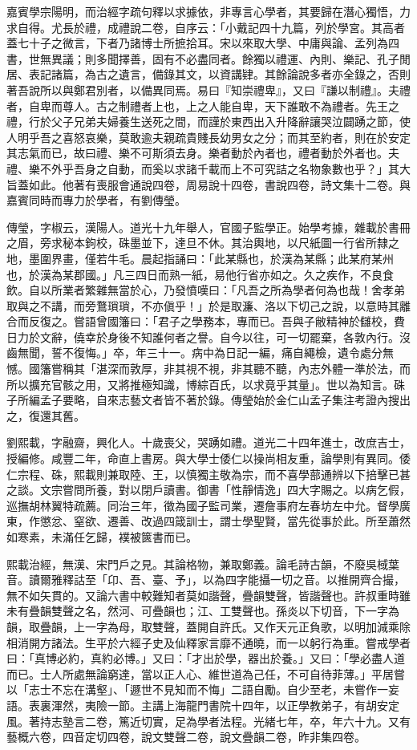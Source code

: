 \begin{pinyinscope}
嘉賓學宗陽明，而治經字疏句釋以求據依，非專言心學者，其要歸在潛心獨悟，力求自得。尤長於禮，成禮說二卷，自序云：「小戴記四十九篇，列於學宮。其高者蓋七十子之微言，下者乃諸博士所摭拾耳。宋以來取大學、中庸與論、孟列為四書，世無異議；則多聞擇善，固有不必盡同者。餘獨以禮運、內則、樂記、孔子閒居、表記諸篇，為古之遺言，備錄其文，以資講肄。其餘論說多者亦全錄之，否則著吾說所以與鄭君別者，以備異同焉。易曰『知崇禮卑』，又曰『謙以制禮』。夫禮者，自卑而尊人。古之制禮者上也，上之人能自卑，天下誰敢不為禮者。先王之禮，行於父子兄弟夫婦養生送死之間，而謹於東西出入升降辭讓哭泣闢踴之節，使人明乎吾之喜怒哀樂，莫敢逾夫親疏貴賤長幼男女之分；而其至約者，則在於安定其志氣而已，故曰禮、樂不可斯須去身。樂者動於內者也，禮者動於外者也。夫禮、樂不外乎吾身之自動，而奚以求諸千載而上不可究詰之名物象數也乎？」其大旨蓋如此。他著有喪服會通說四卷，周易說十四卷，書說四卷，詩文集十二卷。與嘉賓同時而專力於學者，有劉傳瑩。

傳瑩，字椒云，漢陽人。道光十九年舉人，官國子監學正。始學考據，雜載於書冊之眉，旁求秘本鉤校，硃墨並下，達旦不休。其治輿地，以尺紙圖一行省所隸之地，墨圍界畫，僅若牛毛。晨起指誦曰：「此某縣也，於漢為某縣；此某府某州也，於漢為某郡國。」凡三四日而熟一紙，易他行省亦如之。久之疾作，不良食飲。自以所業者繁雜無當於心，乃發憤嘆曰：「凡吾之所為學者何為也哉！舍孝弟取與之不講，而旁鶩瑣瑣，不亦傎乎！」於是取濂、洛以下切己之說，以意時其離合而反復之。嘗語曾國籓曰：「君子之學務本，專而已。吾與子敝精神於讎校，費日力於文辭，僥幸於身後不知誰何者之譽。自今以往，可一切罷棄，各敦內行。沒齒無聞，誓不復悔。」卒，年三十一。病中為日記一編，痛自繩檢，遺令處分無憾。國籓嘗稱其「湛深而敦厚，非其視不視，非其聽不聽，內志外體一準於法，而所以擴充官骸之用，又將推極知識，博綜百氏，以求竟乎其量」。世以為知言。硃子所編孟子要略，自來志藝文者皆不著於錄。傳瑩始於金仁山孟子集注考證內搜出之，復還其舊。

劉熙載，字融齋，興化人。十歲喪父，哭踴如禮。道光二十四年進士，改庶吉士，授編修。咸豐二年，命直上書房。與大學士倭仁以操尚相友重，論學則有異同。倭仁宗程、硃，熙載則兼取陸、王，以慎獨主敬為宗，而不喜學蔀通辨以下掊擊已甚之談。文宗嘗問所養，對以閉戶讀書。御書「性靜情逸」四大字賜之。以病乞假，巡撫胡林翼特疏薦。同治三年，徵為國子監司業，遷詹事府左春坊左中允。督學廣東，作懲忿、窒欲、遷善、改過四箴訓士，謂士學聖賢，當先從事於此。所至蕭然如寒素，未滿任乞歸，襆被篋書而已。

熙載治經，無漢、宋門戶之見。其論格物，兼取鄭義。論毛詩古韻，不廢吳棫葉音。讀爾雅釋詁至「卬、吾、臺、予」，以為四字能攝一切之音。以推開齊合撮，無不如矢貫的。又論六書中較難知者莫如諧聲，疊韻雙聲，皆諧聲也。許叔重時雖未有疊韻雙聲之名，然河、可疊韻也；江、工雙聲也。孫炎以下切音，下一字為韻，取疊韻，上一字為母，取雙聲，蓋開自許氏。又作天元正負歌，以明加減乘除相消開方諸法。生平於六經子史及仙釋家言靡不通曉，而一以躬行為重。嘗戒學者曰：「真博必約，真約必博。」又曰：「才出於學，器出於養。」又曰：「學必盡人道而已。士人所處無論窮達，當以正人心、維世道為己任，不可自待菲薄。」平居嘗以「志士不忘在溝壑」、「遯世不見知而不悔」二語自勵。自少至老，未嘗作一妄語。表裏渾然，夷險一節。主講上海龍門書院十四年，以正學教弟子，有胡安定風。著持志塾言二卷，篤近切實，足為學者法程。光緒七年，卒，年六十九。又有藝概六卷，四音定切四卷，說文雙聲二卷，說文疊韻二卷，昨非集四卷。


\end{pinyinscope}
